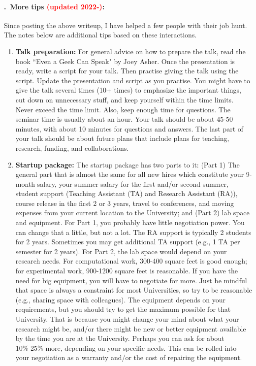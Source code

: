 \documentclass[14pt]{article}
\newcounter{myparagraph}
\renewcommand{\themyparagraph}{\arabic{myparagraph}}
\newcommand{\nparagraph}[1]{%
  \refstepcounter{myparagraph}%
  \paragraph{\themyparagraph.~#1}%
}
\begin{document}
\nparagraph{More tips \textcolor{red}{(updated 2022-)}:} Since posting the above writeup, I have helped a few people with their job hunt. The notes below are additional tips based on these interactions.
\begin{enumerate}
\item {\bf Talk preparation:} For general advice on how to prepare the talk, read the book ``Even a Geek Can Speak" by Joey Asher. Once the presentation is ready, write a script for your talk. Then practise giving the talk using the script. Update the presentation and script as you practise. You might have to give the talk several times (10+ times) to emphasize the important things, cut down on unnecessary stuff, and keep yourself within the time limits. Never exceed the time limit. Also, keep enough time for questions. The seminar time is usually about an hour. Your talk should be about 45-50 minutes, with about 10 minutes for questions and answers. The last part of your talk should be about future plans that include plans for teaching, research, funding, and collaborations.
\item {\bf Startup package:} The startup package has two parts to it: (Part 1) The general part that is almost the same for all new hires which constitute your 9-month salary, your summer salary for the first and/or second summer, student support (Teaching Assistant (TA) and Research Assistant (RA)), course release in the first 2 or 3 years, travel to conferences, and moving expenses from your current location to the University; and (Part 2) lab space and equipment. For Part 1, you probably have little negotiation power. You can change that a little, but not a lot. The RA support is typically 2 students for 2 years. Sometimes you may get additional TA support (e.g., 1 TA per semester for 2 years). For Part 2, the lab space would depend on your research needs. For computational work, 300-400 square feet is good enough; for experimental work, 900-1200 square feet is reasonable. If you have the need for big equipment, you will have to negotiate for more. Just be mindful that space is always a constraint for most Universities, so try to be reasonable (e.g., sharing space with colleagues). The equipment depends on your requirements, but you should try to get the maximum possible for that University. That is because you might change your mind about what your research might be, and/or there might be new or better equipment available by the time you are at the University. Perhaps you can ask for about 10\%-25\% more, depending on your specific needs. This can be rolled into your negotiation as a warranty and/or the cost of repairing the equipment. 

\end{enumerate}
\end{document}
